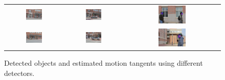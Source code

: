 \begin{figure}[t]
\centering
\begin{tabular}{c c c}
\includegraphics[width=0.3\textwidth]{chapter4/resource/ped_seq_3.jpg} & \includegraphics[width=0.3\textwidth]{chapter4/resource/IMG_3375.jpg} &
\includegraphics[width=0.3\textwidth]{chapter4/resource/IMG_3000-alldect.jpg}  \\
\includegraphics[width=0.3\textwidth]{chapter4/resource/ped_seq_4.jpg} &
\includegraphics[width=0.3\textwidth]{chapter4/resource/IMG_3365.jpg} &
\includegraphics[width=0.3\textwidth]{chapter4/resource/IMG_3073-alldect.jpg}
\end{tabular}
\caption[Example of the object detection output and the estimated motion tangent.]{Detected objects and estimated motion tangents using different detectors.}
\label{fig:detection}
\end{figure}

